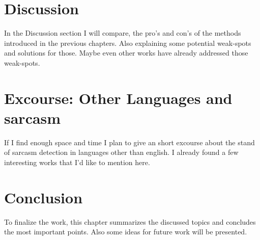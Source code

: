 \documentclass[sigconf,  review=false, nonacm=true]{acmart}
\begin{document}
\section{Discussion}

In the Discussion section I will compare, the pro's and con's of the methods introduced in the previous chapters. Also explaining some potential weak-spots and solutions for those.
Maybe even other works have already addressed those weak-spots.

\section{Excourse: Other Languages and sarcasm}
If I find enough space and time I plan to give an short excourse about the stand of sarcasm detection in languages other than english. I already found a few interesting works that I'd like to mention here. \cite{Sarcasm-Detection-on-Czech-and-English-Twitter} \cite{The-perfect-solution-for-detecting-sarcasm-in-tweets-not}

\section{Conclusion}

To finalize the work, this chapter summarizes the discussed topics and concludes the most important points. 
Also some ideas for future work will be presented.






\appendix
\end{document}
